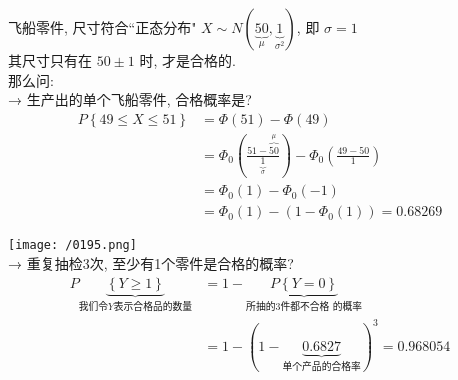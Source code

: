 \documentclass[UTF8]{ctexart}
\begin{document}
\begin{myEnvSample}
飞船零件, 尺寸符合``正态分布" $X\sim N\left( \underset{\mu}{\underbrace{50}},\underset{\sigma ^2}{\underbrace{1}} \right) $, 即 $\sigma=1$ \\
其尺寸只有在 $50 \pm 1$ 时, 才是合格的. \\

那么问:  \\
→ 生产出的单个飞船零件, 合格概率是? 
\begin{align*}  %
	P\left\{ 49\leq X\leq 51 \right\} 
&=\varPhi \left( 51 \right) -\varPhi \left( 49 \right)\\
&=\varPhi _0\left( \frac{51-\overset{\mu}{\overbrace{50}}}{\underset{\sigma}{\underbrace{1}}} \right) -\varPhi _0\left( \frac{49-50}{1} \right)\\
&=\varPhi _0\left( 1 \right) -\varPhi _0\left( -1 \right)\\
&=\varPhi _0\left( 1 \right) -\left( 1-\varPhi _0\left( 1 \right) \right) =0.68269 
\end{align*}

\texttt{[image: /0195.png]} \\



→ 重复抽检3次, 至少有1个零件是合格的概率?
\begin{align*}  %
	P\underset{\text{我们令}Y\text{表示合格品的数量}}{\underbrace{\left\{ Y\ge 1 \right\} }}
	&=1-\underset{\text{所抽的3件都不合格\ 的概率}}{\underbrace{P\left\{ Y=0 \right\} }}\\
&=1-\left( 1-\underset{\text{单个产品的合格率}}{\underbrace{0.6827}} \right) ^3=0.968054
\end{align*}
\end{myEnvSample}
\vspace{1em} 




\begin{myEnvSample}

\end{myEnvSample}
\end{document}
